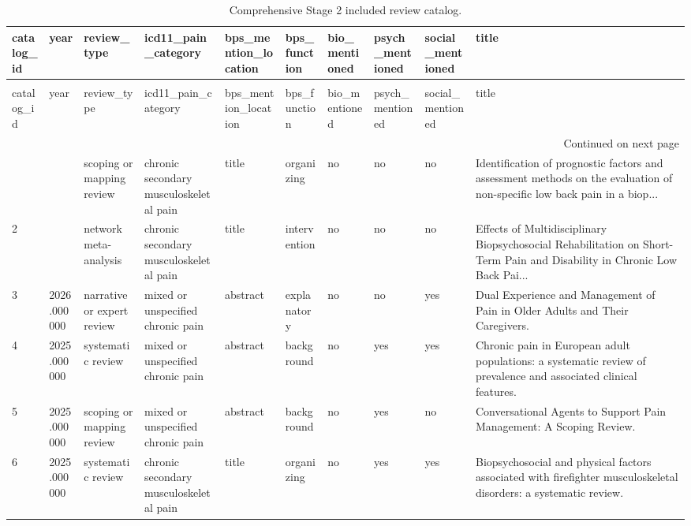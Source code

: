 \setlength{\LTleft}{0pt}
\setlength{\LTright}{0pt}
\setlength{\tabcolsep}{1pt}
\tiny
\begin{longtable}{p{0.7cm}p{0.7cm}p{1.2cm}p{1.9cm}p{1.3cm}p{1.5cm}p{0.55cm}p{0.55cm}p{0.55cm}p{3.2cm}}
\caption{Comprehensive Stage 2 included review catalog.} \label{tab.included.catalog} \\
\toprule
catalog\_id & year & review\_type & icd11\_pain\_category & bps\_mention\_location & bps\_function & bio\_mentioned & psych\_mentioned & social\_mentioned & title \\
\midrule
\endfirsthead
\caption[]{Comprehensive Stage 2 included review catalog.} \\
\toprule
catalog\_id & year & review\_type & icd11\_pain\_category & bps\_mention\_location & bps\_function & bio\_mentioned & psych\_mentioned & social\_mentioned & title \\
\midrule
\endhead
\midrule
\multicolumn{10}{r}{Continued on next page} \\
\midrule
\endfoot
\bottomrule
\endlastfoot
1 &  & scoping or mapping review & chronic secondary musculoskeletal pain & title & organizing & no & no & no & Identification of prognostic factors and assessment methods on the evaluation of non-specific low back pain in a biop... \\
2 &  & network meta-analysis & chronic secondary musculoskeletal pain & title & intervention & no & no & no & Effects of Multidisciplinary Biopsychosocial Rehabilitation on Short-Term Pain and Disability in Chronic Low Back Pai... \\
3 & 2026.000000 & narrative or expert review & mixed or unspecified chronic pain & abstract & explanatory & no & no & yes & Dual Experience and Management of Pain in Older Adults and Their Caregivers. \\
4 & 2025.000000 & systematic review & mixed or unspecified chronic pain & abstract & background & no & yes & yes & Chronic pain in European adult populations: a systematic review of prevalence and associated clinical features. \\
5 & 2025.000000 & scoping or mapping review & mixed or unspecified chronic pain & abstract & background & no & yes & no & Conversational Agents to Support Pain Management: A Scoping Review. \\
6 & 2025.000000 & systematic review & chronic secondary musculoskeletal pain & title & organizing & no & yes & yes & Biopsychosocial and physical factors associated with firefighter musculoskeletal disorders: a systematic review. \\

\end{longtable}
